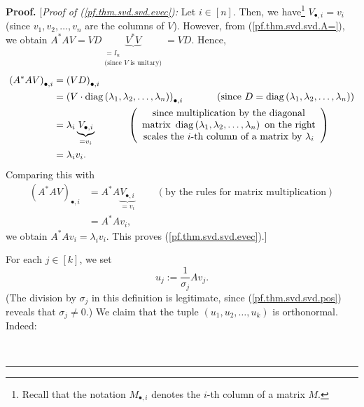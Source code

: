 \documentclass[numbers=enddot,12pt,final,onecolumn,notitlepage]{scrartcl}%
\numberwithin{exer}{subsection}
\theoremstyle{definition}
\newenvironment{proof}[1][Proof]{\noindent\textbf{#1.} }{\ \rule{0.5em}{0.5em}}
\begin{document}
\begin{proof}
[\textit{Proof of (\ref{pf.thm.svd.svd.evec}):} Let $i\in\left[  n\right]  $.
Then, we have\footnote{Recall that the notation $M_{\bullet,i}$ denotes the
$i$-th column of a matrix $M$.} $V_{\bullet,i}=v_{i}$ (since $v_{1}%
,v_{2},\ldots,v_{n}$ are the columns of $V$). However, from
(\ref{pf.thm.svd.svd.A=}), we obtain $A^{\ast}AV=VD\underbrace{V^{\ast}%
V}_{\substack{=I_{n}\\\text{(since }V\text{ is unitary)}}}=VD$. Hence,%
\begin{align*}
\left(  A^{\ast}AV\right)  _{\bullet,i}  &  =\left(  VD\right)  _{\bullet,i}\\
&  =\left(  V\cdot\operatorname*{diag}\left(  \lambda_{1},\lambda_{2}%
,\ldots,\lambda_{n}\right)  \right)  _{\bullet,i}\ \ \ \ \ \ \ \ \ \ \left(
\text{since }D=\operatorname*{diag}\left(  \lambda_{1},\lambda_{2}%
,\ldots,\lambda_{n}\right)  \right) \\
&  =\lambda_{i}\underbrace{V_{\bullet,i}}_{=v_{i}}\ \ \ \ \ \ \ \ \ \ \left(
\begin{array}
[c]{c}%
\text{since multiplication by the diagonal}\\
\text{matrix }\operatorname*{diag}\left(  \lambda_{1},\lambda_{2}%
,\ldots,\lambda_{n}\right)  \text{ on the right}\\
\text{scales the }i\text{-th column of a matrix by }\lambda_{i}%
\end{array}
\right) \\
&  =\lambda_{i}v_{i}.
\end{align*}
Comparing this with%
\begin{align*}
\left(  A^{\ast}AV\right)  _{\bullet,i}  &  =A^{\ast}A\underbrace{V_{\bullet
,i}}_{=v_{i}}\ \ \ \ \ \ \ \ \ \ \left(  \text{by the rules for matrix
multiplication}\right) \\
&  =A^{\ast}Av_{i},
\end{align*}
we obtain $A^{\ast}Av_{i}=\lambda_{i}v_{i}$. This proves
(\ref{pf.thm.svd.svd.evec}).] \medskip

For each $j\in\left[  k\right]  $, we set%
\[
u_{j}:=\dfrac{1}{\sigma_{j}}Av_{j}.
\]
(The division by $\sigma_{j}$ in this definition is legitimate, since
(\ref{pf.thm.svd.svd.pos}) reveals that $\sigma_{j}\neq0$.) We claim that the
tuple $\left(  u_{1},u_{2},\ldots,u_{k}\right)  $ is orthonormal. Indeed:


\end{proof}
\end{document}
